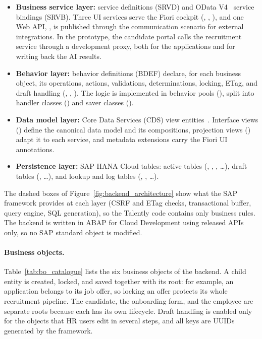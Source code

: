 \begin{itemize}
    \item \textbf{Business service layer:} service definitions (SRVD) and OData V4~\cite{odata} service bindings (SRVB). Three UI services serve the Fiori cockpit (, , ), and one Web API, , is published through the communication scenario  for external integrations. In the prototype, the candidate portal calls the recruitment service  through a development proxy, both for the applications and for writing back the AI results.
    \item \textbf{Behavior layer:} behavior definitions (BDEF) declare, for each business object, its operations, actions, validations, determinations, locking, ETag, and draft handling (, , ). The logic is implemented in behavior pools (), split into handler classes () and saver classes ().
    \item \textbf{Data model layer:} Core Data Services (CDS) view entities~\cite{sap_cds}. Interface views () define the canonical data model and its compositions, projection views () adapt it to each service, and metadata extensions carry the Fiori UI annotations.
    \item \textbf{Persistence layer:} SAP HANA Cloud tables: active tables (, , , \ldots), draft tables (, \ldots), and lookup and log tables (, , \ldots).
\end{itemize}

The dashed boxes of Figure~\ref{fig:backend_architecture} show what the SAP framework provides at each layer (CSRF and ETag checks, transactional buffer, query engine, SQL generation), so the Talently code contains only business rules. The backend is written in ABAP for Cloud Development using released APIs only, so no SAP standard object is modified.

\paragraph*{Business objects.} Table~\ref{tab:bo_catalogue} lists the six business objects of the backend. A child entity is created, locked, and saved together with its root: for example, an application belongs to its job offer, so locking an offer protects its whole recruitment pipeline. The candidate, the onboarding form, and the employee are separate roots because each has its own lifecycle. Draft handling is enabled only for the objects that HR users edit in several steps, and all keys are UUIDs generated by the framework.

